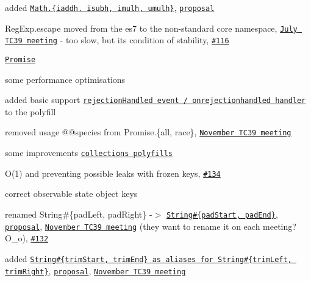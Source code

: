 \begin{DoxyItemize}
\item added \href{https://github.com/zloirock/core-js#ecmascript-7-proposals}{\tt {\ttfamily Math.\{iaddh, isubh, imulh, umulh\}}}, \href{https://gist.github.com/BrendanEich/4294d5c212a6d2254703}{\tt proposal}
\item {\ttfamily Reg\+Exp.\+escape} moved from the {\ttfamily es7} to the non-\/standard {\ttfamily core} namespace, \href{https://github.com/rwaldron/tc39-notes/blob/master/es7/2015-07/july-28.md#62-regexpescape}{\tt July T\+C39 meeting} -\/ too slow, but it\textquotesingle{}s condition of stability, \href{https://github.com/zloirock/core-js/issues/116}{\tt \#116}
\item \href{https://github.com/zloirock/core-js#ecmascript-6-promise}{\tt {\ttfamily Promise}}
\begin{DoxyItemize}
\item some performance optimisations
\item added basic support \href{https://github.com/zloirock/core-js#unhandled-rejection-tracking}{\tt {\ttfamily rejection\+Handled} event / {\ttfamily onrejectionhandled} handler} to the polyfill
\item removed usage {\ttfamily @@species} from {\ttfamily Promise.\{all, race\}}, \href{https://github.com/rwaldron/tc39-notes/tree/master/es7/2015-11/nov-18.md#conclusionresolution-2}{\tt November T\+C39 meeting}
\end{DoxyItemize}
\item some improvements \href{https://github.com/zloirock/core-js#ecmascript-6-collections}{\tt collections polyfills}
\begin{DoxyItemize}
\item {\ttfamily O(1)} and preventing possible leaks with frozen keys, \href{https://github.com/zloirock/core-js/issues/134}{\tt \#134}
\item correct observable state object keys
\end{DoxyItemize}
\item renamed {\ttfamily String\#\{pad\+Left, pad\+Right\}} -\/$>$ \href{https://github.com/zloirock/core-js#ecmascript-7-proposals}{\tt {\ttfamily String\#\{pad\+Start, pad\+End\}}}, \href{https://github.com/tc39/proposal-string-pad-start-end}{\tt proposal}, \href{https://github.com/rwaldron/tc39-notes/tree/master/es7/2015-11/nov-17.md#conclusionresolution-2}{\tt November T\+C39 meeting} (they want to rename it on each meeting?O\+\_\+o), \href{https://github.com/zloirock/core-js/issues/132}{\tt \#132}
\item added \href{https://github.com/zloirock/core-js#ecmascript-7-proposals}{\tt {\ttfamily String\#\{trim\+Start, trim\+End\}} as aliases for {\ttfamily String\#\{trim\+Left, trim\+Right\}}}, \href{https://github.com/sebmarkbage/ecmascript-string-left-right-trim}{\tt proposal}, \href{https://github.com/rwaldron/tc39-notes/tree/master/es7/2015-11/nov-17.md#conclusionresolution-2}{\tt November T\+C39 meeting}

\end{DoxyItemize}
